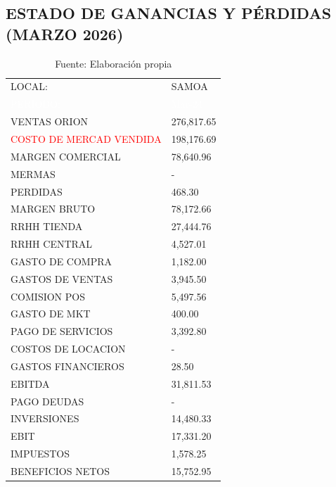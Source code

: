 \subsection*{ESTADO DE GANANCIAS Y PÉRDIDAS (MARZO 2026)}

\begin{table}[H]
\centering
\begin{tabular}{|L{8cm}|R{4cm}|}
\hline
{} LOCAL: &  SAMOA \\ 
\textcolor{white}{PERIODO:} & \textcolor{white}{Mar-24} \\ \hline
{} VENTAS ORION & 276,817.65 \\ 
\textcolor{red}{COSTO DE MERCAD VENDIDA} & 198,176.69 \\ 
 MARGEN COMERCIAL & 78,640.96 \\ 
MERMAS & - \\ 
PERDIDAS & 468.30 \\ 
 MARGEN BRUTO & 78,172.66 \\ 
RRHH TIENDA & 27,444.76 \\ 
RRHH CENTRAL & 4,527.01 \\ 
GASTO DE COMPRA & 1,182.00 \\ 
GASTOS DE VENTAS & 3,945.50 \\ 
COMISION POS & 5,497.56 \\ 
GASTO DE MKT & 400.00 \\ 
PAGO DE SERVICIOS & 3,392.80 \\ 
COSTOS DE LOCACION & - \\ 
GASTOS FINANCIEROS & 28.50 \\ 
 EBITDA & 31,811.53 \\ 
PAGO DEUDAS & - \\ 
INVERSIONES & 14,480.33 \\ 
 EBIT & 17,331.20 \\ 
IMPUESTOS & 1,578.25 \\ 
 BENEFICIOS NETOS & 15,752.95 \\ \hline
\end{tabular}
\caption{Fuente: Elaboración propia}
\end{table}

\vspace{1cm}

